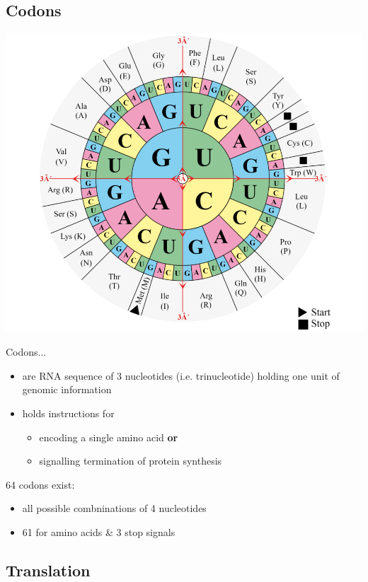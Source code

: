 \documentclass[11pt,fleqn]{book}
\begin{document}
\subsection{Codons}
\begin{center}
    \includegraphics[width=0.65\linewidth]{Pictures/Screenshot 2024-02-25 185241.png}
\end{center}
Codons...
\begin{itemize}
    \item are RNA sequence of 3 nucleotides (i.e. trinucleotide) holding one unit of genomic information
    \item holds instructions for
    \begin{itemize}
        \item encoding a single amino acid \textbf{or}
        \item signalling termination of protein synthesis
    \end{itemize}
\end{itemize}
64 codons exist:
\begin{itemize}
    \item all possible combninations of 4 nucleotides
    \item 61 for amino acids \& 3 stop signals
\end{itemize}
\subsection{Translation}
\end{document}
